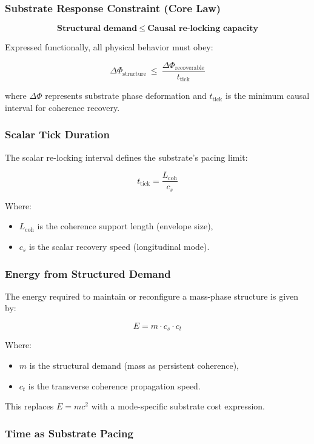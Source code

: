\documentclass[entropy,article,submit,pdftex,moreauthors]{Definitions/mdpi}
\begin{document}
\subsubsection{Substrate Response Constraint (Core Law)}

\[
\textbf{Structural demand} \ \leq \ \textbf{Causal re-locking capacity}
\]

Expressed functionally, all physical behavior must obey:

\[
\Delta \Phi_{\text{structure}} \ \leq \ \frac{\Delta \Phi_{\text{recoverable}}}{t_{\text{tick}}}
\]

where \( \Delta \Phi \) represents substrate phase deformation and \( t_{\text{tick}} \) is the minimum causal interval for coherence recovery.

\subsubsection{Scalar Tick Duration}

The scalar re-locking interval defines the substrate's pacing limit:

\[
t_{\text{tick}} = \frac{L_{\text{coh}}}{c_s}
\]

Where:
\begin{itemize}
    \item \( L_{\text{coh}} \) is the coherence support length (envelope size),
    \item \( c_s \) is the scalar recovery speed (longitudinal mode).
\end{itemize}

\subsubsection{Energy from Structured Demand}

The energy required to maintain or reconfigure a mass-phase structure is given by:

\[
E = m \cdot c_s \cdot c_t
\]

Where:
\begin{itemize}
    \item \( m \) is the structural demand (mass as persistent coherence),
    \item \( c_t \) is the transverse coherence propagation speed.
\end{itemize}

This replaces \( E = mc^2 \) with a mode-specific substrate cost expression.

\subsubsection{Time as Substrate Pacing}
\end{document}
